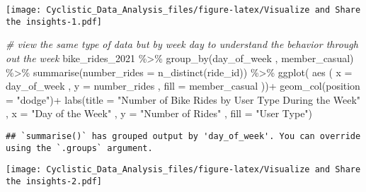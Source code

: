 \documentclass[
]{article}
\newenvironment{Shaded}{\begin{snugshade}}{\end{snugshade}}
\newcommand{\AttributeTok}[1]{\textcolor[rgb]{0.77,0.63,0.00}{#1}}
\newcommand{\CommentTok}[1]{\textcolor[rgb]{0.56,0.35,0.01}{\textit{#1}}}
\newcommand{\FunctionTok}[1]{\textcolor[rgb]{0.00,0.00,0.00}{#1}}
\newcommand{\NormalTok}[1]{#1}
\newcommand{\SpecialCharTok}[1]{\textcolor[rgb]{0.00,0.00,0.00}{#1}}
\newcommand{\StringTok}[1]{\textcolor[rgb]{0.31,0.60,0.02}{#1}}
\begin{document}
\texttt{[image: Cyclistic\_Data\_Analysis\_files/figure-latex/Visualize and Share the insights-1.pdf]}

\begin{Shaded}
\begin{Highlighting}[]
\CommentTok{\# view the same type of data but by week day to understand the behavior through out the week }
\NormalTok{bike\_rides\_2021 }\SpecialCharTok{\%\textgreater{}\%} \FunctionTok{group\_by}\NormalTok{(day\_of\_week , member\_casual) }\SpecialCharTok{\%\textgreater{}\%} \FunctionTok{summarise}\NormalTok{(}\AttributeTok{number\_rides =} \FunctionTok{n\_distinct}\NormalTok{(ride\_id)) }\SpecialCharTok{\%\textgreater{}\%} 
  \FunctionTok{ggplot}\NormalTok{( }\FunctionTok{aes}\NormalTok{ ( }\AttributeTok{x =}\NormalTok{ day\_of\_week , }\AttributeTok{y =}\NormalTok{ number\_rides , }\AttributeTok{fill =}\NormalTok{ member\_casual ))}\SpecialCharTok{+}
  \FunctionTok{geom\_col}\NormalTok{(}\AttributeTok{position =} \StringTok{"dodge"}\NormalTok{)}\SpecialCharTok{+}
  \FunctionTok{labs}\NormalTok{(}\AttributeTok{title =} \StringTok{"Number of Bike Rides by User Type During the Week"}\NormalTok{  , }\AttributeTok{x =} \StringTok{"Day of the Week"}\NormalTok{ , }\AttributeTok{y =} \StringTok{"Number of Rides"}\NormalTok{ , }\AttributeTok{fill =} \StringTok{"User Type"}\NormalTok{)}
\end{Highlighting}
\end{Shaded}

\begin{verbatim}
## `summarise()` has grouped output by 'day_of_week'. You can override using the `.groups` argument.
\end{verbatim}

\texttt{[image: Cyclistic\_Data\_Analysis\_files/figure-latex/Visualize and Share the insights-2.pdf]}
\end{document}
